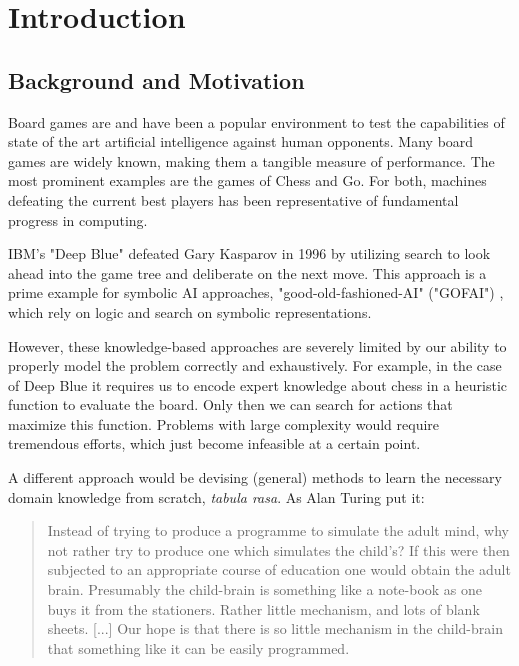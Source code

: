 \chapter{Introduction}
\label{introduction}
\section{Background and Motivation}
Board games are and have been a popular environment to test the capabilities of state of the art artificial intelligence against human opponents. Many board games are widely known, making them a tangible measure of performance. The most prominent examples are the games of Chess and Go. For both, machines defeating the current best players has been representative of fundamental progress in computing.

IBM's "Deep Blue" defeated Gary Kasparov in 1996 \cite{higgins_brief_2017} by utilizing search to look ahead into the game tree and deliberate on the next move. This approach is a prime example for symbolic AI approaches, "good-old-fashioned-AI" ("GOFAI") \cite[p. 112f]{haugeland_artificial_1985}, which rely on logic and search on symbolic representations.

However, these knowledge-based approaches are severely limited by our ability to properly model the problem correctly and exhaustively. For example, in the case of Deep Blue it requires us to encode expert knowledge about chess in a heuristic function to evaluate the board. Only then we can search for actions that maximize this function. Problems with large complexity would require tremendous efforts, which just become infeasible at a certain point.

A different approach would be devising (general) methods to learn the necessary domain knowledge from scratch,  \emph{tabula rasa}. As Alan Turing put it:

\begin{quote}
    Instead of trying to produce a programme to simulate the adult mind, why not rather try to produce one which simulates the child’s? If this were then subjected to an appropriate course of education one would obtain the adult brain. Presumably the child-brain is something like a note-book as one buys it from the stationers. Rather little mechanism, and lots of blank sheets. [...] Our hope is that there is so little mechanism in the child-brain that something like it can be easily programmed.
    \cite{turing_icomputing_1950}
\end{quote}

